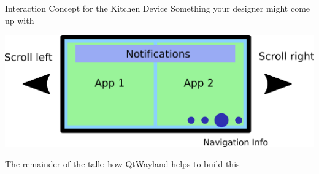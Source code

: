 \documentclass[ucs,9pt]{beamer}
\begin{document}
\begin{frame}
    {Interaction Concept for the Kitchen Device}
    {Something your designer might come up with}

    \begin{center}
        \includegraphics[width=.8\paperwidth]{interactionconcept.png}
    \end{center}
    \bigskip

    The remainder of the talk: how QtWayland helps to build this
\end{frame}
\end{document}
